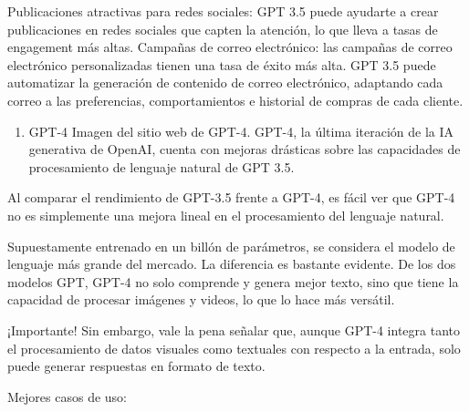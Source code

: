 \documentclass[a4paper12pt]{article}
\providecommand{\tightlist}{%
      \setlength{\itemsep}{0pt}\setlength{\parskip}{0pt}}
\begin{document}
Publicaciones atractivas para redes sociales: GPT 3.5 puede ayudarte a
crear publicaciones en redes sociales que capten la atención, lo que
lleva a tasas de engagement más altas. Campañas de correo electrónico:
las campañas de correo electrónico personalizadas tienen una tasa de
éxito más alta. GPT 3.5 puede automatizar la generación de contenido de
correo electrónico, adaptando cada correo a las preferencias,
comportamientos e historial de compras de cada cliente.

\begin{enumerate}
\def\labelenumi{\arabic{enumi}.}
\setcounter{enumi}{1}
\tightlist
\item
  GPT-4 Imagen del sitio web de GPT-4. GPT-4, la última iteración de la
  IA generativa de OpenAI, cuenta con mejoras drásticas sobre las
  capacidades de procesamiento de lenguaje natural de GPT 3.5.
\end{enumerate}

Al comparar el rendimiento de GPT-3.5 frente a GPT-4, es fácil ver que
GPT-4 no es simplemente una mejora lineal en el procesamiento del
lenguaje natural.

Supuestamente entrenado en un billón de parámetros, se considera el
modelo de lenguaje más grande del mercado. La diferencia es bastante
evidente. De los dos modelos GPT, GPT-4 no solo comprende y genera mejor
texto, sino que tiene la capacidad de procesar imágenes y videos, lo que
lo hace más versátil.

¡Importante! Sin embargo, vale la pena señalar que, aunque GPT-4 integra
tanto el procesamiento de datos visuales como textuales con respecto a
la entrada, solo puede generar respuestas en formato de texto.

Mejores casos de uso:
\end{document}
